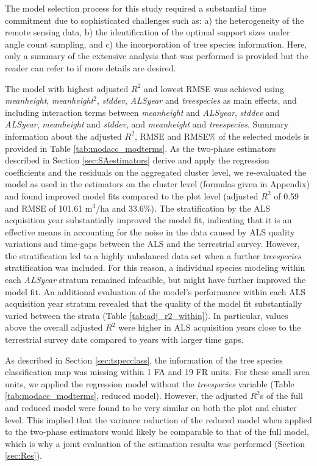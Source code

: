 \documentclass[remotesensing,article,submit,moreauthors,pdftex,10pt,a4paper]{mdpi}
\newcommand{\adjrsq}{adjusted $R^2$}
\newcommand{\mha}{m$^3$/ha}
\newcommand{\meanheight}{\textit{meanheight}}
\newcommand{\stddev}{\textit{stddev}}
\newcommand{\treespecies}{\textit{treespecies}}
\newcommand{\alsyear}{\textit{ALSyear}}
\begin{document}
The model selection process for this study required a substantial time commitment due to sophisticated challenges such as: a) the heterogeneity of the remote sensing data, b) the identification of the optimal support sizes under angle count sampling, and c) the incorporation of tree species information. Here, only a summary of the extensive analysis that was performed is provided but the reader can refer to \citet{hill2017a} if more details are desired.\par
The model with highest \adjrsq{} and lowest RMSE was achieved using \meanheight{}, \meanheight{}$^2$, \stddev{}, \alsyear{} and \treespecies{} as main effects, and including interaction terms between \meanheight{} and \alsyear{}, \stddev{} and \alsyear{}, \meanheight{} and \stddev{}, and \meanheight{} and \treespecies{}. Summary information about the \adjrsq{}, RMSE and RMSE\% of the selected models is provided in Table \ref{tab:modacc_modterms}. As the two-phase estimators described in Section \ref{sec:SAestimators} derive and apply the regression coefficients and the residuals on the aggregated cluster level, we re-evaluated the model as used in the estimators on the cluster level (formulas given in Appendix) and found improved model fits compared to the plot level (\adjrsq{} of 0.59 and RMSE of 101.61 \mha{} and 33.6\%). The stratification by the ALS acquisition year substantially improved the model fit, indicating that it is an effective means in accounting for the noise in the data caused by ALS quality variations and time-gaps between the ALS and the terrestrial survey. However, the stratification led to a highly unbalanced data set when a further \treespecies{} stratification was included. For this reason, a individual species modeling within each \alsyear{} stratum remained infeasible, but might have further improved the model fit. An additional evaluation of the model's performance within each ALS acquisition year stratum revealed that the quality of the model fit substantially varied between the strata (Table \ref{tab:adj_r2_within}). In particular, values above the overall \adjrsq{} were higher in ALS acquisition years close to the terrestrial survey date compared to years with larger time gaps.\par
As described in Section \ref{sec:tspecclass}, the information of the tree species classification map was missing within 1 FA and 19 FR units. For these small area units, we applied the regression model without the \treespecies{} variable (Table \ref{tab:modacc_modterms}, reduced model). However, the \adjrsq{}s of the full and reduced model were found to be very similar on both the plot and cluster level. This implied that the variance reduction of the reduced model when applied to the two-phase estimators would likely be comparable to that of the full model, which is why a joint evaluation of the estimation results was performed (Section \ref{sec:Res}).
\end{document}
